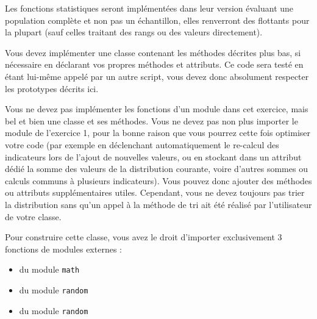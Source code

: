 

\vspace*{0.7cm}

\noindent {}

\noindent Les fonctions statistiques seront implémentées dans leur version évaluant une population complète et non pas un échantillon, elles renverront des flottants pour la plupart (sauf celles traitant des rangs ou des valeurs directement).

\bigskip

\noindent Vous devez implémenter une classe  contenant les méthodes décrites plus bas, si nécessaire en déclarant vos propres méthodes et attributs.
Ce code sera testé en étant lui-même appelé par un autre script, vous devez donc absolument respecter les prototypes décrits ici.

\bigskip

\noindent Vous ne devez pas implémenter les fonctions d'un module dans cet exercice, mais bel et bien une classe et ses méthodes.
Vous ne devez pas non plus importer le module de l'exercice 1, pour la bonne raison que vous pourrez cette fois optimiser votre code (par exemple en déclenchant automatiquement le re-calcul des indicateurs lors de l'ajout de nouvelles valeurs, ou en stockant dans un attribut dédié la somme des valeurs de la distribution courante, voire d'autres sommes ou calculs communs à plusieurs indicateurs).
Vous pouvez donc ajouter des méthodes ou attributs supplémentaires utiles.
Cependant, vous ne devez toujours pas trier la distribution sans qu'un appel à la méthode de tri ait été réalisé par l'utilisateur de votre classe.

\bigskip

\noindent Pour construire cette classe, vous avez le droit d'importer exclusivement 3 fonctions de modules externes :

\begin{itemize}
\item {} du module \texttt{math}
\item {} du module \texttt{random}
\item {} du module \texttt{random}
\end{itemize}

